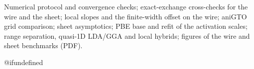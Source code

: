 \documentclass[journal=jctcce,manuscript=article]{achemso}
\begin{document}
\begin{suppinfo}
Numerical protocol and convergence checks; exact-exchange cross-checks for the
wire and the sheet; local slopes and the finite-width offset on the wire;
aniGTO grid comparison; sheet asymptotics; PBE base and refit of the
activation scales; range separation, quasi-1D LDA/GGA and local hybrids;
figures of the wire and sheet benchmarks (PDF).
\end{suppinfo}

\providecommand{\latin}[1]{#1}
\makeatletter
\providecommand{\doi}
  {\begingroup\let\do\@makeother\dospecials
  \catcode`\{=1 \catcode`\}=2 \doi@aux}
\providecommand{\doi@aux}[1]{\endgroup\texttt{#1}}
\makeatother
\providecommand*\mcitethebibliography{\thebibliography}
\csname @ifundefined
  {\let\endmcitethebibliography\endthebibliography}{}
\end{document}
